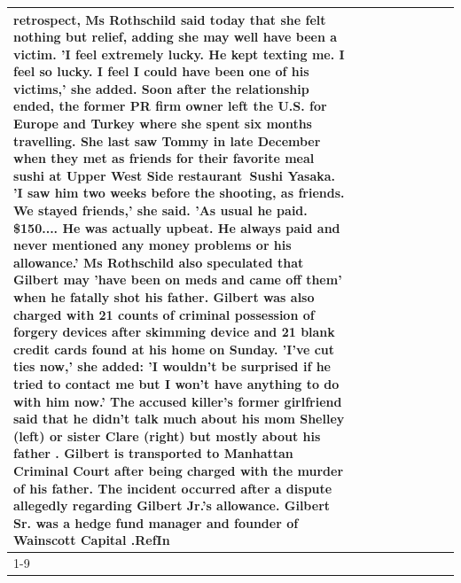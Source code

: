 \begin{table}[H]
\begin{tabular}{lllrlllll}
retrospect, Ms Rothschild said today that she felt nothing but relief, adding she may well have been a victim. 'I feel extremely lucky. He kept texting me. I feel so lucky. I feel I could have been one of his victims,' she added. Soon after the relationship ended, the former PR firm owner left the U.S. for Europe and Turkey where she spent six months  travelling. She last saw Tommy in late December when they met as friends for their favorite meal sushi at Upper West Side restaurant Sushi Yasaka. 'I saw him two weeks before the shooting, as friends. We stayed friends,' she said. 'As usual he paid. \$150.... He was actually upbeat. He always paid and never mentioned any money problems or his allowance.' Ms Rothschild also speculated that Gilbert may 'have been on meds and came off them' when he fatally shot his father. Gilbert was also charged with 21 counts of criminal possession of forgery devices after skimming device and 21 blank credit cards found at his home on Sunday. 'I've cut ties now,' she added: 'I wouldn’t be surprised if he tried to contact me but I won’t have anything to do with him now.' The accused killer's former girlfriend said that he didn't talk much about his mom Shelley (left) or sister Clare (right) but mostly about his father . Gilbert is transported to Manhattan Criminal Court  after being charged with the murder of his father. The incident occurred after a dispute allegedly regarding Gilbert Jr.'s allowance. Gilbert Sr. was a hedge fund manager and founder of Wainscott Capital .RefIn \\
\cline{1-9} \cline{2-9}

\end{tabular}
\end{table}
